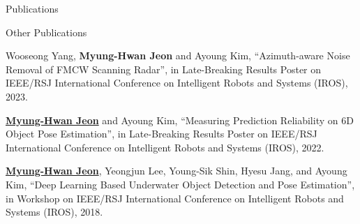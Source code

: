 \begin{rSection}{Publications}
\begin{pubSubsection}{Other Publications}
  \item Wooseong Yang, \textbf{Myung-Hwan Jeon} and Ayoung Kim, “Azimuth-aware Noise Removal of FMCW Scanning Radar”, in Late-Breaking Results Poster on IEEE/RSJ International Conference on Intelligent Robots and Systems (IROS), 2023.  

  \item \underline{\textbf{Myung-Hwan Jeon}} and Ayoung Kim, “Measuring Prediction Reliability on 6D Object Pose Estimation”, in Late-Breaking Results Poster on IEEE/RSJ International Conference on Intelligent Robots and Systems (IROS), 2022.  

  \item \underline{\textbf{Myung-Hwan Jeon}}, Yeongjun Lee, Young-Sik Shin, Hyesu Jang, and Ayoung Kim, “Deep Learning Based Underwater Object Detection and Pose Estimation”, in Workshop on IEEE/RSJ International Conference on Intelligent Robots and Systems (IROS), 2018.

\end{pubSubsection} 





\end{rSection}

